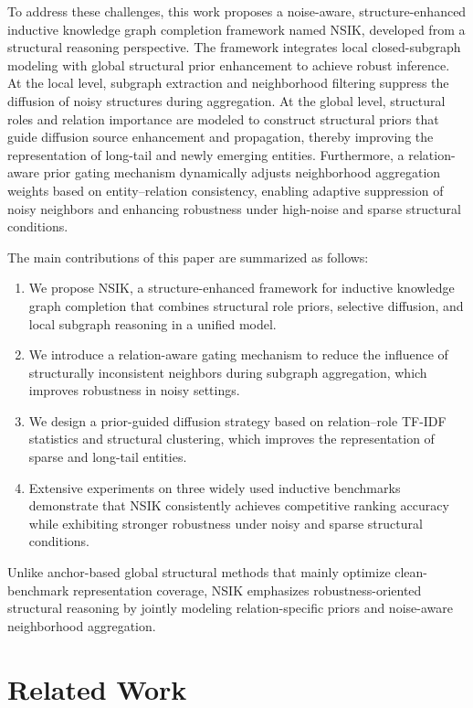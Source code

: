 \documentclass[preprint,12pt]{elsarticle}
\begin{document}
To address these challenges, this work proposes a noise-aware, structure-enhanced inductive knowledge graph completion framework named NSIK, developed from a structural reasoning perspective. The framework integrates local closed-subgraph modeling with global structural prior enhancement to achieve robust inference. At the local level, subgraph extraction and neighborhood filtering suppress the diffusion of noisy structures during aggregation. At the global level, structural roles and relation importance are modeled to construct structural priors that guide diffusion source enhancement and propagation, thereby improving the representation of long-tail and newly emerging entities. Furthermore, a relation-aware prior gating mechanism dynamically adjusts neighborhood aggregation weights based on entity–relation consistency, enabling adaptive suppression of noisy neighbors and enhancing robustness under high-noise and sparse structural conditions.

The main contributions of this paper are summarized as follows:

\begin{enumerate}
    \item We propose NSIK, a structure-enhanced framework for inductive knowledge graph completion that combines structural role priors, selective diffusion, and local subgraph reasoning in a unified model.
    \item We introduce a relation-aware gating mechanism to reduce the influence of structurally inconsistent neighbors during subgraph aggregation, which improves robustness in noisy settings.
    \item We design a prior-guided diffusion strategy based on relation--role TF-IDF statistics and structural clustering, which improves the representation of sparse and long-tail entities.
    \item Extensive experiments on three widely used inductive benchmarks demonstrate that NSIK consistently achieves competitive ranking accuracy while exhibiting stronger robustness under noisy and sparse structural conditions.
\end{enumerate}

Unlike anchor-based global structural methods that mainly optimize clean-benchmark representation coverage, NSIK emphasizes robustness-oriented structural reasoning by jointly modeling relation-specific priors and noise-aware neighborhood aggregation.

\section{Related Work}
\end{document}
